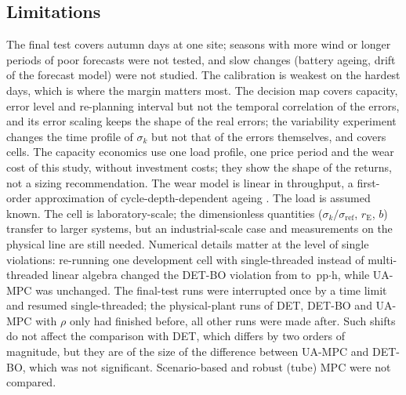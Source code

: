 \documentclass[a4paper,fleqn]{cas-dc}
\newcommand{\pph}{\,pp$\cdot$h\xspace}
\newcommand{\DET}{DET\xspace}
\newcommand{\DETBO}{DET-BO\xspace}
\newcommand{\UA}{UA-MPC\xspace}
\newcommand{\rE}{r_{\mathrm{E}}}
\begin{document}
\subsection{Limitations}
The final test covers \daysFin autumn days at one site; seasons with more wind or longer periods of poor forecasts were not tested, and slow changes (battery ageing, drift of the forecast model) were not studied. The calibration is weakest on the hardest days, which is where the margin matters most. The decision map covers capacity, error level and re-planning interval but not the temporal correlation of the errors, and its error scaling keeps the shape of the real errors; the variability experiment changes the time profile of $\sigma_k$ but not that of the errors themselves, and covers \varCells cells. The capacity economics use one load profile, one price period and the wear cost of this study, without investment costs; they show the shape of the returns, not a sizing recommendation. The wear model is linear in throughput, a first-order approximation of cycle-depth-dependent ageing \cite{xu2018factoring}. The load is assumed known. The cell is laboratory-scale; the dimensionless quantities ($\sigma_k/\sigma_{\mathrm{ref}}$, $\rE$, $b$) transfer to larger systems, but an industrial-scale case and measurements on the physical line are still needed. Numerical details matter at the level of single violations: re-running one development cell with single-threaded instead of multi-threaded linear algebra changed the \DETBO violation from \devAblBoViol to \mapBaseBoSingle\pph, while \UA was unchanged. The final-test runs were interrupted once by a time limit and resumed single-threaded; the physical-plant runs of \DET, \DETBO and \UA with $\rho$ only had finished before, all other runs were made after. Such shifts do not affect the comparison with \DET, which differs by two orders of magnitude, but they are of the size of the difference between \UA and \DETBO, which was not significant. Scenario-based and robust (tube) MPC were not compared.

\end{document}

